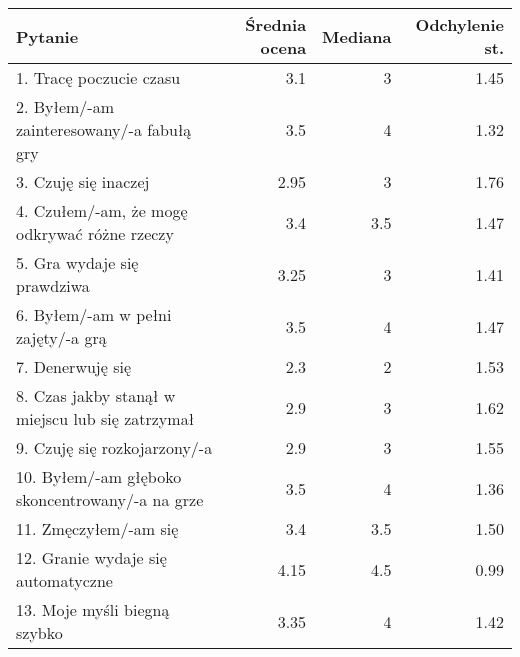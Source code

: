 \begin{table}[h!]
    \begin{center}
        \begin{tabular}{|m{10em}|r|r|r|}
            \hline
            Pytanie                                                           & Średnia ocena & Mediana & Odchylenie st. \\
            \hline
            1. Tracę poczucie czasu                                           & 3.1           & 3       & 1.45           \\
            2. Byłem/-am \newline zainteresowany/-a fabułą gry                & 3.5           & 4       & 1.32           \\
            3. Czuję się inaczej                                              & 2.95          & 3       & 1.76           \\
            4. Czułem/-am, że mogę odkrywać różne rzeczy                      & 3.4           & 3.5     & 1.47           \\
            5. Gra wydaje się prawdziwa                                       & 3.25          & 3       & 1.41           \\
            6. Byłem/-am \newline w pełni zajęty/-a grą                       & 3.5           & 4       & 1.47           \\
            7. Denerwuję się                                                  & 2.3           & 2       & 1.53           \\
            8. Czas jakby stanął w miejscu lub się zatrzymał                  & 2.9           & 3       & 1.62           \\
            9. Czuję się \newline rozkojarzony/-a                             & 2.9           & 3       & 1.55           \\
            10. Byłem/-am głęboko \newline skoncentrowany/-a \newline na grze & 3.5           & 4       & 1.36           \\
            11. Zmęczyłem/-am się                                             & 3.4           & 3.5     & 1.50           \\
            12. Granie wydaje się automatyczne                                & 4.15          & 4.5     & 0.99           \\
            13. Moje myśli \newline biegną szybko                             & 3.35          & 4       & 1.42           \\

\end{tabular}
\end{center}
\end{table}
